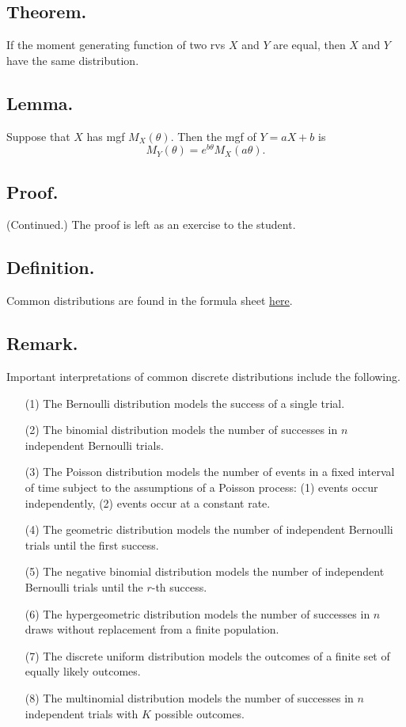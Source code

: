 \documentclass[titlepage]{article}
\begin{document}
\subsection{Theorem.} If the moment generating function of two rvs $X$ and $Y$ are equal, then $X$ and $Y$ have the same distribution.

\subsection{Lemma.} Suppose that $X$ has mgf $M_{X}(\theta)$. Then the mgf of $Y = aX + b$ is
$$M_{Y}(\theta) = e^{b\theta}M_{X}(a\theta).$$

\subsection{Proof.} (Continued.) The proof is left as an exercise to the student.

\subsection{Definition.} Common distributions are found in the formula sheet \href{https://github.com/dyao13/EN_553_420_SP24/blob/main/420distribution_table.pdf}{\underline{here}}.

\subsection{Remark.} Important interpretations of common discrete distributions include the following.
\begin{enumerate}
\item[(1)] The Bernoulli distribution models the success of a single trial.
\item[(2)] The binomial distribution models the number of successes in $n$ independent Bernoulli trials.
\item[(3)] The Poisson distribution models the number of events in a fixed interval of time subject to the assumptions of a Poisson process: (1) events occur independently, (2) events occur at a constant rate.
\item[(4)] The geometric distribution models the number of independent Bernoulli trials until the first success.
\item[(5)] The negative binomial distribution models the number of independent Bernoulli trials until the $r$-th success.
\item[(6)] The hypergeometric distribution models the number of successes in $n$ draws without replacement from a finite population.
\item[(7)] The discrete uniform distribution models the outcomes of a finite set of equally likely outcomes.
\item[(8)] The multinomial distribution models the number of successes in $n$ independent trials with $K$ possible outcomes.
\end{enumerate}
\end{document}
